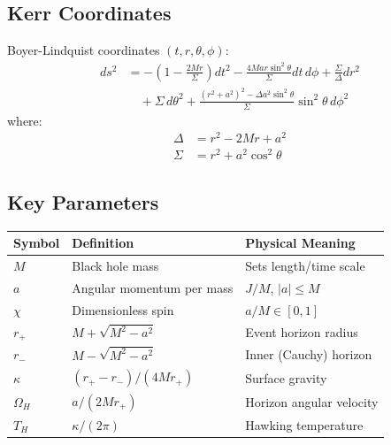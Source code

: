 \documentclass[12pt,a4paper]{article}
\begin{document}
\subsection{Kerr Coordinates}

Boyer-Lindquist coordinates $(t, r, \theta, \phi)$:
\begin{align}
ds^2 &= -\left(1 - \frac{2Mr}{\Sigma}\right) dt^2 - \frac{4Mar\sin^2\theta}{\Sigma} dt\,d\phi + \frac{\Sigma}{\Delta} dr^2 \\
&\quad + \Sigma \, d\theta^2 + \frac{(r^2 + a^2)^2 - \Delta a^2 \sin^2\theta}{\Sigma} \sin^2\theta \, d\phi^2
\end{align}
where:
\begin{align}
\Delta &= r^2 - 2Mr + a^2 \\
\Sigma &= r^2 + a^2 \cos^2\theta
\end{align}

\subsection{Key Parameters}

\begin{center}
\renewcommand{\arraystretch}{1.3}
\begin{tabular}{@{}lll@{}}
\toprule
\textbf{Symbol} & \textbf{Definition} & \textbf{Physical Meaning} \\
\midrule
$M$ & Black hole mass & Sets length/time scale \\
$a$ & Angular momentum per mass & $J/M$, $|a| \leq M$ \\
$\chi$ & Dimensionless spin & $a/M \in [0, 1]$ \\
$r_+$ & $M + \sqrt{M^2 - a^2}$ & Event horizon radius \\
$r_-$ & $M - \sqrt{M^2 - a^2}$ & Inner (Cauchy) horizon \\
$\kappa$ & $(r_+ - r_-)/(4Mr_+)$ & Surface gravity \\
$\Omega_H$ & $a/(2Mr_+)$ & Horizon angular velocity \\
$T_H$ & $\kappa/(2\pi)$ & Hawking temperature \\
\bottomrule
\end{tabular}
\end{center}
\end{document}
